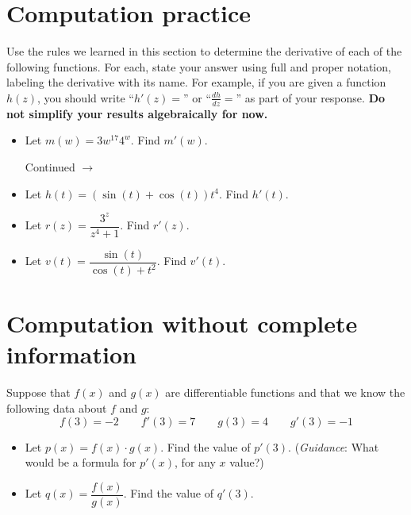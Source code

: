 \documentclass[11pt]{article}
\def\ra{\rightarrow}
\def\pageturn{\vfill 
\begin{flushright}
	\begin{small}
		Continued $\ra$
	\end{small}
\end{flushright} \newpage}
\begin{document}
\section{Computation practice}

Use the rules we learned in this section to determine the derivative of each of the following functions. For
each, state your answer using full and proper notation, labeling the derivative with its name. For example, if you are given a function $h(z)$, you should write ``$h'(z) =$'' or ``$\frac{dh}{dz}=$'' as part of your response. \textbf{Do not simplify your results algebraically for now. }

\begin{itemize}
	\item Let $m(w) = 3w^{17}4^w$. Find $m'(w)$. 
	
	\pageturn
	
	\item Let $h(t) = (\sin(t) + \cos(t))t^4$. Find $h'(t)$. 
	
	\vspace{1.2in}
	
	\item Let $r(z) = \dfrac{3^z}{z^4 + 1}$. Find $r'(z)$. 
	
	\vspace{1.2in}
	
	\item Let $v(t) = \dfrac{\sin(t)}{\cos(t) + t^2}$. Find $v'(t)$.
	
	\vspace{1.2in} 
\end{itemize}

\section{Computation without complete information}

Suppose that $f(x)$ and $g(x)$ are differentiable functions and that we know the following data about $f$ and $g$: 
\[ f(3) = -2 \qquad f'(3) = 7 \qquad g(3) = 4 \qquad g'(3) = -1 \] 
\begin{itemize}
	\item Let $p(x) = f(x) \cdot g(x)$. Find the value of $p'(3)$. (\emph{Guidance}: What would be a formula for $p'(x)$, for any $x$ value?) 
	
	
	
	\vspace{1.5in}
	
	\item Let $q(x) = \dfrac{f(x)}{g(x)}$. Find the value of $q'(3)$. 
\end{itemize}
\end{document}
